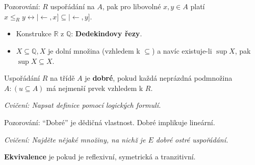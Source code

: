 Pozorování: $R$ uspořádání na $A$, pak pro libovolné $x,y \in A$ platí $x \leq_{R} y \leftrightarrow |\leftarrow,x] \subseteq |\leftarrow,y]$.

\begin{pozn}
	\begin{itemize}
		\item Konstrukce $\mathbb{R}$ z $\mathbb{Q}$: \textbf{Dedekindovy řezy}.
		\item $X \subseteq \mathbb{Q}, X$ je dolní množina (vzhledem k $\subseteq$) a navíc existuje-li $\sup X$, pak $\sup X \subseteq X$.
	\end{itemize}
\end{pozn}

\begin{definice}
	Uspořádání $R$ na třídě $A$ je \textbf{dobré}, pokud každá neprázdná podmnožina $A: (u \subseteq A)$ má nejmenší prvek vzhledem k $R$.
\end{definice}

\textit{Cvičení: Napsat definice pomocí logických formulí.}

Pozorování: “Dobré” je dědičná vlastnost. Dobré implikuje lineární.

\textit{Cvičení: Najděte nějaké množiny, na nichž je $E$ dobré ostré uspořádání.}

\begin{definice}
	\textbf{Ekvivalence} je pokud je reflexivní, symetrická a tranzitivní.
\end{definice}